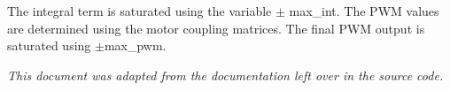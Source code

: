 \documentclass{article}
\begin{document}
The integral term is saturated using the variable $\pm$ max\_int. The PWM values are determined using the motor coupling matrices. The final PWM output is saturated using $\pm$max\_pwm.



\begin{center}
\noindent \textit{This document was adapted from the documentation left over in the source code.}
\end{center}
\end{document}
